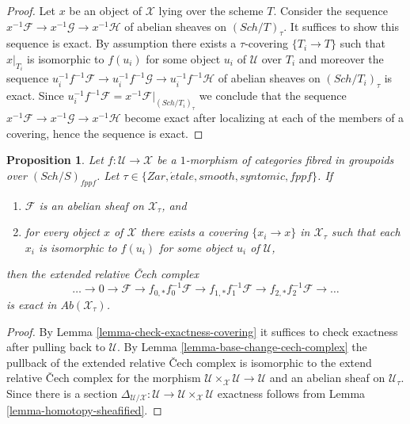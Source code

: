 \documentclass{stacks-project}
\theoremstyle{plain}
\newtheorem{proposition}[subsection]{Proposition}
\theoremstyle{definition}
\theoremstyle{remark}
\numberwithin{equation}{subsection}
\def\Sch{\mathit{Sch}}
\def\etale{{\acute{e}tale}}
\begin{document}
\begin{proof}
Let $x$ be an object of $\mathcal{X}$ lying over the scheme $T$.
Consider the sequence
$x^{-1}\mathcal{F} \to x^{-1}\mathcal{G} \to x^{-1}\mathcal{H}$
of abelian sheaves on $(\Sch/T)_\tau$. It suffices to show
this sequence is exact. By assumption there exists a $\tau$-covering
$\{T_i \to T\}$ such that $x|_{T_i}$ is isomorphic to $f(u_i)$ for
some object $u_i$ of $\mathcal{U}$ over $T_i$ and moreover the sequence
$u_i^{-1}f^{-1}\mathcal{F} \to u_i^{-1}f^{-1}\mathcal{G} \to
u_i^{-1}f^{-1}\mathcal{H}$ of abelian sheaves on $(\Sch/T_i)_\tau$
is exact. Since
$u_i^{-1}f^{-1}\mathcal{F} = x^{-1}\mathcal{F}|_{(\Sch/T_i)_\tau}$
we conclude that the sequence
$x^{-1}\mathcal{F} \to x^{-1}\mathcal{G} \to x^{-1}\mathcal{H}$
become exact after localizing at each of the members of a covering,
hence the sequence is exact.
\end{proof}

\begin{proposition}
\label{proposition-exactness-cech-complex}
Let $f : \mathcal{U} \to \mathcal{X}$ be a $1$-morphism of categories fibred
in groupoids over $(\Sch/S)_{fppf}$. Let
$\tau \in \{Zar, \etale, smooth, syntomic, fppf\}$.
If
\begin{enumerate}
\item $\mathcal{F}$ is an abelian sheaf on $\mathcal{X}_\tau$, and
\item for every object $x$ of $\mathcal{X}$ there exists a covering
$\{x_i \to x\}$ in $\mathcal{X}_\tau$ such that each $x_i$ is isomorphic
to $f(u_i)$ for some object $u_i$ of $\mathcal{U}$,
\end{enumerate}
then the extended relative {\v C}ech complex
$$
\ldots \to 0 \to
\mathcal{F} \to
f_{0, *}f_0^{-1}\mathcal{F} \to
f_{1, *}f_1^{-1}\mathcal{F} \to
f_{2, *}f_2^{-1}\mathcal{F} \to \ldots
$$
is exact in $\textit{Ab}(\mathcal{X}_\tau)$.
\end{proposition}

\begin{proof}
By
Lemma \ref{lemma-check-exactness-covering}
it suffices to check exactness after pulling back to $\mathcal{U}$.
By
Lemma \ref{lemma-base-change-cech-complex}
the pullback of the extended relative {\v C}ech complex is isomorphic
to the extend relative {\v C}ech complex for the morphism
$\mathcal{U} \times_\mathcal{X} \mathcal{U} \to \mathcal{U}$
and an abelian sheaf on $\mathcal{U}_\tau$. Since there is a section
$\Delta_{\mathcal{U}/\mathcal{X}} : \mathcal{U} \to
\mathcal{U} \times_\mathcal{X} \mathcal{U}$ exactness follows from
Lemma \ref{lemma-homotopy-sheafified}.
\end{proof}
\end{document}

